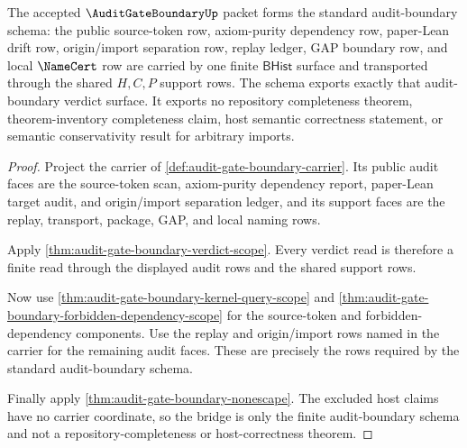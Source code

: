 \begin{theorem}
\label{thm:audit-gate-boundary-standard-bridge}
The accepted $\AuditGateBoundaryUp$ packet forms the standard
audit-boundary schema: the public source-token row, axiom-purity dependency
row, paper-Lean drift row, origin/import separation row, replay ledger, GAP
boundary row, and local $\NameCert$ row are carried by one finite
$\mathsf{BHist}$ surface and transported through the shared $H,C,P$ support
rows. The schema exports exactly that audit-boundary verdict surface. It
exports no repository completeness theorem, theorem-inventory completeness
claim, host semantic correctness statement, or semantic conservativity result
for arbitrary imports.
\end{theorem}
\begin{proof}
Project the carrier of \autoref{def:audit-gate-boundary-carrier}. Its public
audit faces are the source-token scan, axiom-purity dependency report,
paper-Lean target audit, and origin/import separation ledger, and its support
faces are the replay, transport, package, GAP, and local naming rows.

Apply \autoref{thm:audit-gate-boundary-verdict-scope}. Every verdict read is
therefore a finite read through the displayed audit rows and the shared support
rows.

Now use \autoref{thm:audit-gate-boundary-kernel-query-scope} and
\autoref{thm:audit-gate-boundary-forbidden-dependency-scope} for the
source-token and forbidden-dependency components. Use the replay and
origin/import rows named in the carrier for the remaining audit faces. These
are precisely the rows required by the standard audit-boundary schema.

Finally apply \autoref{thm:audit-gate-boundary-nonescape}. The excluded host
claims have no carrier coordinate, so the bridge is only the finite
audit-boundary schema and not a repository-completeness or host-correctness
theorem.
\end{proof}

